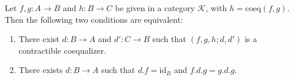 Let $f, g: A \longrightarrow B$ and $h: B \longrightarrow C$ be given in a category $\mathcal{K}$, with $h = \mathrm{coeq}(f, g)$. Then the following two conditions are equivalent:
\begin{enumerate}
\item There exist $d: B \longrightarrow A$ and $d': C \longrightarrow B$ such that $(f, g, h; d, d')$ is a contractible coequalizer.
\item There exists $d: B \longrightarrow A$ such that $d.f = \mathrm{id}_B$ and $f.d.g = g.d.g$.
\end{enumerate}
